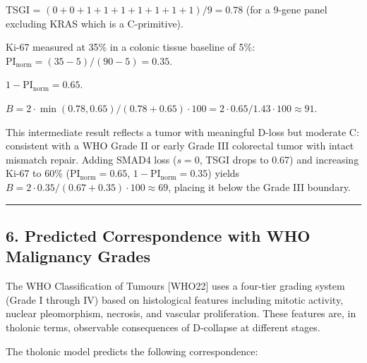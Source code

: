 \documentclass[
  11pt,
  letterpaper,
]{article}
\begin{document}
TSGI = \((0 + 0 + 1 + 1 + 1 + 1 + 1 + 1 + 1)/9 = 0.78\) (for a 9-gene
panel excluding KRAS which is a C-primitive).

Ki-67 measured at 35\% in a colonic tissue baseline of 5\%:
\(\text{PI}_\text{norm} = (35-5)/(90-5) = 0.35\).

\(1 - \text{PI}_\text{norm} = 0.65\).

\(B = 2 \cdot \min(0.78, 0.65) / (0.78 + 0.65) \cdot 100 = 2 \cdot 0.65 / 1.43 \cdot 100 \approx 91\).

This intermediate result reflects a tumor with meaningful D-loss but
moderate C: consistent with a WHO Grade II or early Grade III colorectal
tumor with intact mismatch repair. Adding SMAD4 loss (\(s = 0\), TSGI
drops to 0.67) and increasing Ki-67 to 60\%
(\(\text{PI}_\text{norm} = 0.65\), \(1 - \text{PI}_\text{norm} = 0.35\))
yields \(B = 2 \cdot 0.35 / (0.67 + 0.35) \cdot 100 \approx 69\),
placing it below the Grade III boundary.

\begin{center}\rule{0.5\linewidth}{0.5pt}\end{center}

\subsection{6. Predicted Correspondence with WHO Malignancy
Grades}\label{predicted-correspondence-with-who-malignancy-grades}

The WHO Classification of Tumours {[}WHO22{]} uses a four-tier grading
system (Grade I through IV) based on histological features including
mitotic activity, nuclear pleomorphism, necrosis, and vascular
proliferation. These features are, in tholonic terms, observable
consequences of D-collapse at different stages.

The tholonic model predicts the following correspondence:
\end{document}
